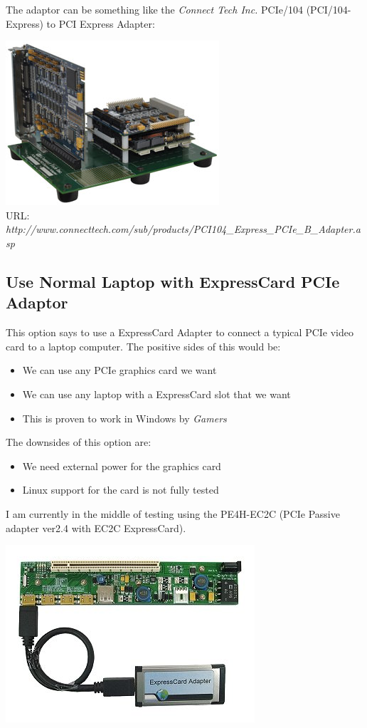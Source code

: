 \documentclass{article}
\begin{document}
The adaptor can be something like the \textit{Connect Tech Inc.} PCIe/104 (PCI/104-Express) to PCI Express Adapter:

\begin{center}
\includegraphics[width=0.75\columnwidth]{./pix/ADG021_web.jpg}\\
URL: \textit{http://www.connecttech.com/sub/products/PCI104\_Express\_PCIe\_B\_Adapter.asp}
\end{center}

\subsection{Use Normal Laptop with ExpressCard PCIe Adaptor}
This option says to use a ExpressCard Adapter to connect a typical PCIe video card to a laptop computer.
The positive sides of this would be:
\begin{itemize}
\item We can use any PCIe graphics card we want
\item We can use any laptop with a ExpressCard slot that we want
\item This is proven to work in Windows by \textit{Gamers}
\end{itemize}

The downsides of this option are:
\begin{itemize}
\item We need external power for the graphics card
\item Linux support for the card is not fully tested
\end{itemize}

I am currently in the middle of testing using the PE4H-EC2C (PCIe Passive adapter ver2.4 with EC2C ExpressCard).

\begin{center}
\includegraphics[width=0.75\columnwidth]{./pix/expresscard.jpg}\\
\end{center}
\end{document}
